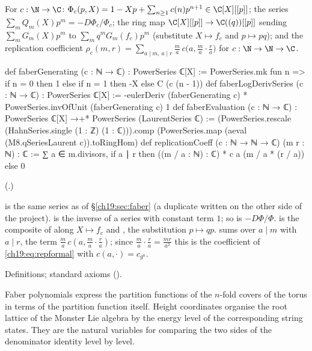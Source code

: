 \begin{definition}\label{ch19:def:faberheight}
For $c:\N\to\C$: $\Phi_c(p,X)=1-Xp+\sum_{n\ge1}c(n)p^{n+1}\in\C[X][[p]]$; the series $\sum_mQ_m(X)p^m=-D\Phi_c/\Phi_c$; the ring map
$\C[X][[p]]\to\C((q))[[p]]$ sending $\sum_mG_m(X)p^m$ to $\sum_mq^mG_m(f_c)p^m$ (substitute $X\mapsto f_c$ and $p\mapsto pq$); and the
replication coefficient $\rho_c(m,r)=\sum_{a\mid m,\ a\mid r}\frac ma\,c\bigl(a,\frac ma\cdot\frac ra\bigr)$ for $c:\N\to\N\to\C$.
\end{definition}
\begin{leancode}
def faberGenerating (c : ℕ → ℂ) : PowerSeries ℂ[X] :=
  PowerSeries.mk fun n => if n = 0 then 1 else if n = 1 then -X else C (c (n - 1))
def faberLogDerivSeries (c : ℕ → ℂ) : PowerSeries ℂ[X] :=
  -eulerDeriv (faberGenerating c) * PowerSeries.invOfUnit (faberGenerating c) 1
def faberEvaluation (c : ℕ → ℂ) : PowerSeries ℂ[X] →+* PowerSeries (LaurentSeries ℂ) :=
  (PowerSeries.rescale (HahnSeries.single (1 : ℤ) (1 : ℂ))).comp
    (PowerSeries.map (aeval (M8.qSeriesLaurent c)).toRingHom)
def replicationCoeff (c : ℕ → ℕ → ℂ) (m r : ℕ) : ℂ :=
  ∑ a ∈ m.divisors, if a ∣ r then ((m / a : ℕ) : ℂ) * c a (m / a * (r / a)) else 0
\end{leancode}
(.)
\begin{dictionary}
 is the same series as  of \S\ref{ch19:sec:faber} (a duplicate written on the other
side of the project).   is the inverse of a series with
constant term $1$; so  is $-D\Phi/\Phi$.   is the composite of
 along $X\mapsto f_c$ and , the substitution $p\mapsto qp$.
 sums over $a\mid m$ with $a\mid r$, the term $\frac ma\,c(a,\frac ma\cdot\frac ra)$; since
$\frac ma\cdot\frac ra=\frac{mr}{a^2}$ this is the coefficient of \eqref{ch19:eq:repformal} with $c(a,\cdot)=c_{g^a}$.
\end{dictionary}
\begin{status}Definitions; standard axioms ().\end{status}

\begin{physics}
Faber polynomials express the partition functions of the $n$-fold covers of the torus in terms of the partition
function itself. Height coordinates organise the root lattice of the Monster Lie algebra by the energy level of the
corresponding string states. They are the natural variables for comparing the two sides of the denominator identity
level by level.
\end{physics}

